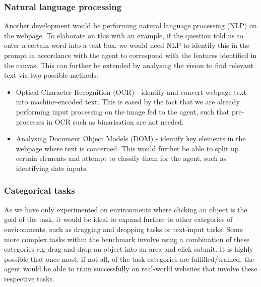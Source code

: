 \documentclass[10pt,journal,compsoc]{IEEEtran}
\begin{document}
\subsubsection{Natural language processing}
Another development would be performing natural language processing (NLP) on the webpage. To elaborate on this with an example, if the question told us to enter a certain word into a text box, we would need NLP to identify this in the prompt in accordance with the agent to correspond with the features identified in the canvas. This can further be extended by analysing the vision to find relevant text via two possible methods:
\indent
\begin{itemize}
\item Optical Character Recognition (OCR) - identify and convert webpage text into machine-encoded text. This is eased by the fact that we are already performing input processing on the image fed to the agent, such that pre-processes in OCR such as binarisation are not needed. 
\item Analysing Document Object Models (DOM) - identify key elements in the webpage where text is concerned. This would further be able to split up certain elements and attempt to classify them for the agent, such as identifying date inputs.
\end{itemize}

\subsubsection{Categorical tasks}
As we have only experimented on environments where clicking an object is the goal of the task, it would be ideal to expand further to other categories of environments, such as dragging and dropping tasks or text-input tasks. Some more complex tasks within the benchmark involve using a combination of these categories e.g drag and drop an object into an area and click submit. It is highly possible that once most, if not all, of the task categories are fulfilled/trained, the agent would be able to train successfully on real-world websites that involve these respective tasks.



\end{document}
